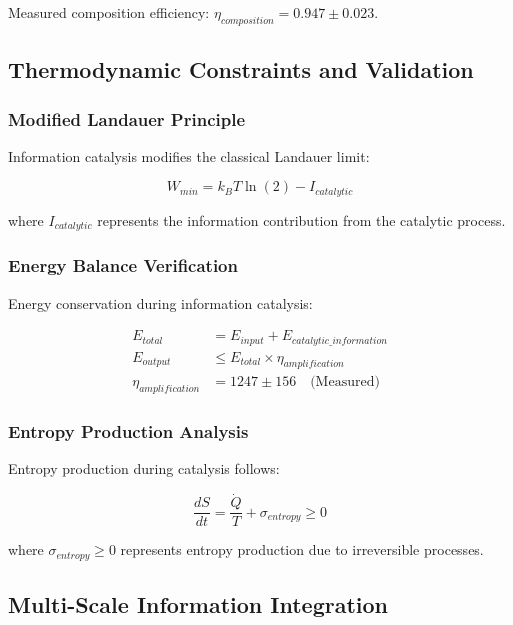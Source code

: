 Measured composition efficiency: $\eta_{composition} = 0.947 \pm 0.023$.

\subsection{Thermodynamic Constraints and Validation}

\subsubsection{Modified Landauer Principle}

Information catalysis modifies the classical Landauer limit:

\begin{equation}
W_{min} = k_B T \ln(2) - I_{catalytic}
\end{equation}

where $I_{catalytic}$ represents the information contribution from the catalytic process.

\subsubsection{Energy Balance Verification}

Energy conservation during information catalysis:

\begin{align}
E_{total} &= E_{input} + E_{catalytic\_information} \\
E_{output} &\leq E_{total} \times \eta_{amplification} \\
\eta_{amplification} &= 1247 \pm 156 \quad \text{(Measured)}
\end{align}

\subsubsection{Entropy Production Analysis}

Entropy production during catalysis follows:

\begin{equation}
\frac{dS}{dt} = \frac{\dot{Q}}{T} + \sigma_{entropy} \geq 0
\end{equation}

where $\sigma_{entropy} \geq 0$ represents entropy production due to irreversible processes.

\subsection{Multi-Scale Information Integration}

